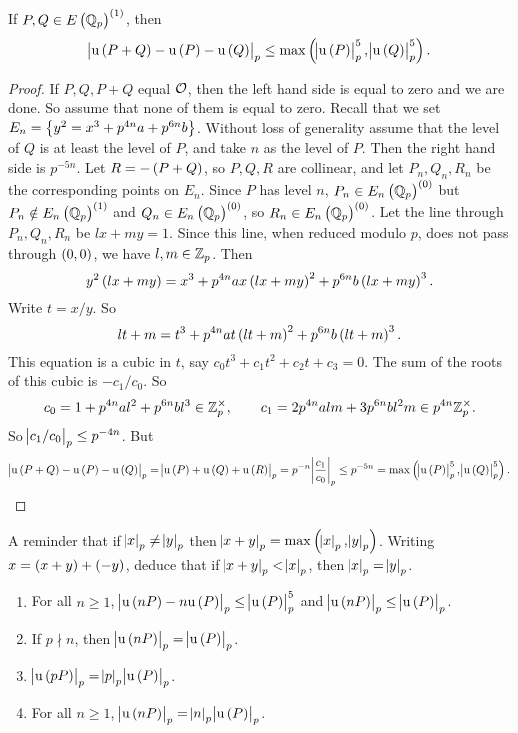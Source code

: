 \begin{lemma}
\label{lem:8.10}
If $ P, Q \in E\br{\QQ_p}^{\br{1}} $, then
$$ \abs{\u\br{P + Q} - \u\br{P} - \u\br{Q}}_p \le \max\br{\abs{\u\br{P}}_p^5, \abs{\u\br{Q}}_p^5}. $$
\end{lemma}

\begin{proof}
If $ P, Q, P + Q $ equal $ \mathcal{O} $, then the left hand side is equal to zero and we are done. So assume that none of them is equal to zero. Recall that we set $ E_n = \cbr{y^2 = x^3 + p^{4n}a + p^{6n}b} $. Without loss of generality assume that the level of $ Q $ is at least the level of $ P $, and take $ n $ as the level of $ P $. Then the right hand side is $ p^{-5n} $. Let $ R = -\br{P + Q} $, so $ P, Q, R $ are collinear, and let $ P_n, Q_n, R_n $ be the corresponding points on $ E_n $. Since $ P $ has level $ n $, $ P_n \in E_n\br{\QQ_p}^{\br{0}} $ but $ P_n \notin E_n\br{\QQ_p}^{\br{1}} $ and $ Q_n \in E_n\br{\QQ_p}^{\br{0}} $, so $ R_n \in E_n\br{\QQ_p}^{\br{0}} $. Let the line through $ P_n, Q_n, R_n $ be $ lx + my = 1 $. Since this line, when reduced modulo $ p $, does not pass through $ \br{0, 0} $, we have $ l, m \in \mathbb{Z}_p $. Then
$$ y^2\br{lx + my} = x^3 + p^{4n}ax\br{lx + my}^2 + p^{6n}b\br{lx + my}^3. $$
Write $ t = x / y $. So
$$ lt + m = t^3 + p^{4n}at\br{lt + m}^2 + p^{6n}b\br{lt + m}^3. $$
This equation is a cubic in $ t $, say $ c_0t^3 + c_1t^2 + c_2t + c_3 = 0 $. The sum of the roots of this cubic is $ -c_1 / c_0 $. So
$$ c_0 = 1 + p^{4n}al^2 + p^{6n}bl^3 \in \mathbb{Z}_p^\times, \qquad c_1 = 2p^{4n}alm + 3p^{6n}bl^2m \in p^{4n}\mathbb{Z}_p^\times. $$
So $ \abs{c_1 / c_0}_p \le p^{-4n} $. But
$$ \abs{\u\br{P + Q} - \u\br{P} - \u\br{Q}}_p = \abs{\u\br{P} + \u\br{Q} + \u\br{R}}_p = p^{-n}\abs{\dfrac{c_1}{c_0}}_p \le p^{-5n} = \max\br{\abs{\u\br{P}}_p^5, \abs{\u\br{Q}}_p^5}. $$
\end{proof}

\pagebreak

A reminder that if $ \abs{x}_p \ne \abs{y}_p $ then $ \abs{x + y}_p = \max\br{\abs{x}_p, \abs{y}_p} $. Writing $ x = \br{x + y} + \br{-y} $, deduce that if $ \abs{x + y}_p < \abs{x}_p $, then $ \abs{x}_p = \abs{y}_p $.

\begin{corollary}
\label{cor:8.11}
\hfill
\begin{enumerate}
\item For all $ n \ge 1 $, $ \abs{\u\br{nP} - n\u\br{P}}_p \le \abs{\u\br{P}}_p^5 $ and $ \abs{\u\br{nP}}_p \le \abs{\u\br{P}}_p $.
\item If $ p \nmid n $, then $ \abs{\u\br{nP}}_p = \abs{\u\br{P}}_p $.
\item $ \abs{\u\br{pP}}_p = \abs{p}_p\abs{\u\br{P}}_p $.
\item For all $ n \ge 1 $, $ \abs{\u\br{nP}}_p = \abs{n}_p\abs{\u\br{P}}_p $.
\end{enumerate}
\end{corollary}

